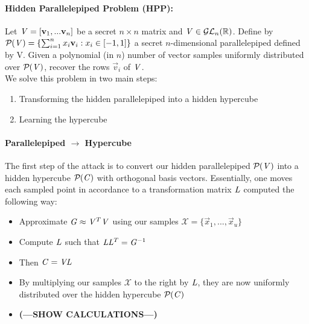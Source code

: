 \paragraph{Hidden Parallelepiped Problem (HPP):} Let $\mathit{V} = [\mathbf{v}_1, ... \mathbf{v}_n ]$ be a secret $n \times n$ matrix and $\mathit{V} \in \mathcal{GL}_{n}(\mathbb{R})$.
Define by $\mathcal{P}_{}(\mathit{V}) = \{\sum_{i=1}^{n} x_i \mathbf{v}_i : x_i \in [-1, 1]\}$ a secret $n$-dimensional parallelepiped defined by V.
Given a polynomial (in $n$) number of vector samples uniformly distributed over $\mathcal{P}_{}(\mathit{V})$, recover the rows $\vec{v}_i$ of $\mathit{V}$. \\
We solve this problem in two main steps: 
\begin{enumerate}
    \item Transforming the hidden parallelepiped into a hidden hypercube
    \item Learning the hypercube
\end{enumerate}
\paragraph{Parallelepiped $\rightarrow$ Hypercube}
The first step of the attack is to convert our hidden parallelepiped $\mathcal{P}_{}(\mathit{V})$ into a hidden hypercube 
$\mathcal{P}_{}(\mathit{C})$ with orthogonal basis vectors.
Essentially, one moves each sampled point in accordance to a transformation matrix $\mathit{L}$ computed the following way: \\
\begin{itemize}
    \item Approximate $\mathit{G} \approx \mathit{V}^T \mathit{V}$ using our samples $\mathcal{X} = \{\vec{x}_1, ..., \vec{x}_u\}$
    \item Compute $\mathit{L}$ such that $\mathit{L} \mathit{L}^{T} = \mathit{G}^{-1}$
    \item Then $\mathit{C} = \mathit{V} \mathit{L}$
    \item By multiplying our samples $\mathcal{X}$ to the right by $\mathit{L}$, they are now uniformly distributed over the hidden hypercube $\mathcal{P}_{}(\mathit{C})$
    \item \textbf{(---SHOW CALCULATIONS---)}
\end{itemize}

